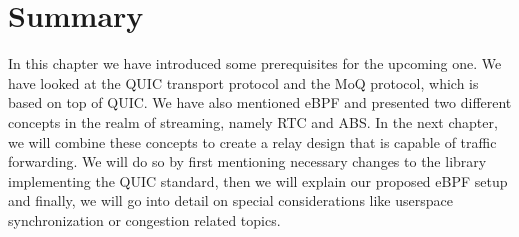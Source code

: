 \section{Summary}\label{sec:summary_ch2}

In this chapter we have introduced some prerequisites for the 
upcoming one.
We have looked at the QUIC transport protocol and the MoQ protocol, which is 
based on top of QUIC\@.
We have also mentioned eBPF and presented two different concepts in the 
realm of streaming, namely RTC and ABS\@.
In the next chapter, we will combine these concepts to create a 
relay design that is capable of traffic forwarding.
We will do so by first mentioning necessary changes to the library 
implementing the QUIC standard, then we will explain our proposed eBPF setup 
and finally, we will go into detail on special considerations like 
userspace synchronization or congestion related topics.